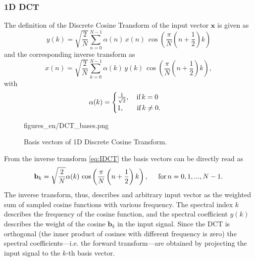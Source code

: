 \subsubsection*{1D DCT}
The definition of the Discrete Cosine Transform of the input vector $\mathbf{x}$ is given as
\begin{equation}
y(k) = \sqrt{\frac{2}{N}} \sum_{n=0}^{N-1} \alpha(n) \, x(n)  \, \cos\left( \frac{\pi}{N} \left( n + \frac{1}{2}\right) k \right)
\label{eq:DCT}
\end{equation}
and the corresponding inverse transform as
\begin{equation}
x(n) = \sqrt{\frac{2}{N}} \sum_{k=0}^{N-1} \alpha(k) \, y(k)  \, \cos\left( \frac{\pi}{N} \left( n + \frac{1}{2}\right) k \right),
\label{eq:IDCT}
\end{equation}
with 
\begin{equation}
\alpha(k) = \begin{cases}  
\frac{1}{\sqrt{2}}, \hspace{3mm} \, \text{if} \, k = 0 \\
1, \hspace{6mm} \, \text{if} \, k \neq 0.
\end{cases}
\end{equation}
\begin{figure}[]
	\centering
	\begin{overpic}[width = 1\columnwidth ]{figures_en/DCT_bases.png}
	\end{overpic}
	\caption{Basis vectors of 1D Discrete Cosine Transform.}
	\label{Fig:1D_dct_bases}
\end{figure}
From the inverse transform \eqref{eq:IDCT} the basis vectors can be directly read as
\begin{equation}
\mathbf{b}_k = \sqrt{\frac{2}{N}}  \alpha(k)  \, \cos\left( \frac{\pi}{N} \left( n + \frac{1}{2}\right) k \right)
, \hspace{5mm} \text{for} \, n = 0,1,...,N-1.
\end{equation}
The inverse transform, thus, describes and arbitrary input vector as the weighted sum of sampled cosine functions with various frequency.
The spectral index $k$ describes the frequency of the cosine function, and the spectral coefficient $y(k)$ describes the weight of the cosine $\mathbf{b}_k$ in the input signal.
Since the DCT is orthogonal (the inner product of cosines with different frequency is zero) the spectral coefficients---i.e. the forward transform---are obtained by projecting the input signal to the $k$-th basis vector.


